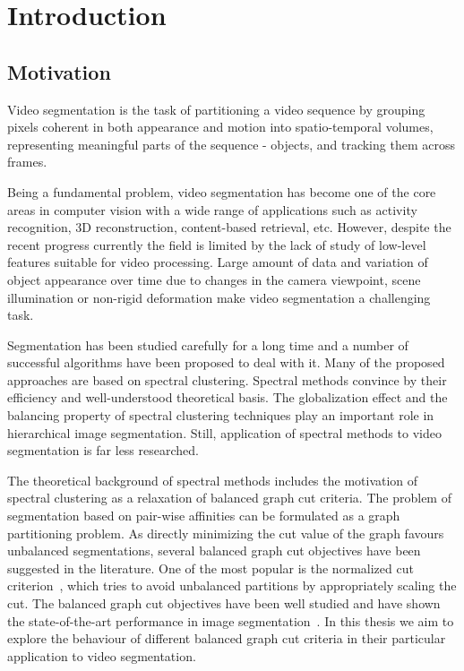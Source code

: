 \chapter{Introduction}
\label{Chapter1}
\section{Motivation}
%
Video segmentation is the task of partitioning a video sequence by grouping pixels coherent in both appearance and motion into spatio-temporal volumes, representing meaningful parts of the sequence - objects,
and tracking them across frames.

Being a fundamental problem, video segmentation has become one of the core areas in computer vision with a wide range of applications such as activity recognition, 3D reconstruction, content-based retrieval, etc. 
However, despite the recent progress currently the field is limited by the lack of study of low-level features suitable for video processing.
Large amount of data and variation of object appearance over time due to changes in the camera viewpoint, scene illumination or non-rigid deformation
make video segmentation a challenging task.

Segmentation has been studied carefully for a long time and a number of successful algorithms have been proposed to deal with it. Many of the proposed approaches are based on
spectral clustering. Spectral methods convince by their efficiency and well-understood theoretical basis. The globalization effect and the balancing property
of spectral clustering techniques play an important role in hierarchical image segmentation. Still, application of spectral methods to video segmentation is far less researched.  

The theoretical background of spectral methods includes the motivation of spectral clustering as a relaxation of balanced graph cut criteria.
The problem of segmentation based on pair-wise affinities can be formulated as a graph partitioning problem. 
As directly minimizing the cut value of the graph favours unbalanced segmentations, several balanced graph cut objectives have been suggested in the literature.
One of the most popular is the normalized cut criterion~\cite{Shi00}, which tries to avoid unbalanced partitions by appropriately scaling the cut. 
The balanced graph cut objectives have been well studied and have shown the state-of-the-art performance in image segmentation~\cite{Arbelaez11}.
In this thesis we aim to explore the behaviour of different balanced graph cut criteria in their particular application to video segmentation.


